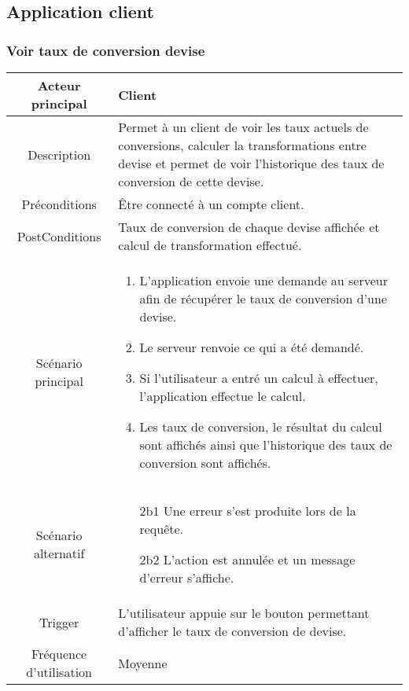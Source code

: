 \documentclass{article}
\begin{document}
\subsection{Application client}
\subsubsection{Voir taux de conversion devise}
\begin{table}[h]
   \begin{tabular}{|c|p{10cm}|}
      \hline
      Acteur principal&Client\\
      \hline
      Description&Permet à un client de voir les taux actuels de conversions, calculer la transformations entre devise et permet de voir l'historique des taux de conversion de cette devise.\\
      \hline
      Préconditions&Être connecté à un compte client.\\
      \hline
      PostConditions&Taux de conversion de chaque devise affichée et calcul de transformation effectué.\\
      \hline
      Scénario principal& 
            \begin{enumerate}
               \item L'application envoie une demande au serveur afin de récupérer le taux de conversion d'une devise.
               \item Le serveur renvoie ce qui a été demandé.
               \item Si l'utilisateur a entré un calcul à effectuer, l'application effectue le calcul.
               \item Les taux de conversion, le résultat du calcul sont affichés ainsi que l'historique des taux de conversion sont affichés.
            \end{enumerate}     \\
      \hline
      Scénario alternatif&
            \begin{itemize}
               \item[2b1] Une erreur s'est produite lors de la requête.
               \item[2b2] L'action est annulée et un message d'erreur s'affiche.  
            \end{itemize}\\
      \hline
      Trigger&L'utilisateur appuie sur le bouton permettant d'afficher le taux de conversion de devise.\\
      \hline
      Fréquence d'utilisation&Moyenne\\
      \hline
   \end{tabular}
\end{table}
\end{document}
